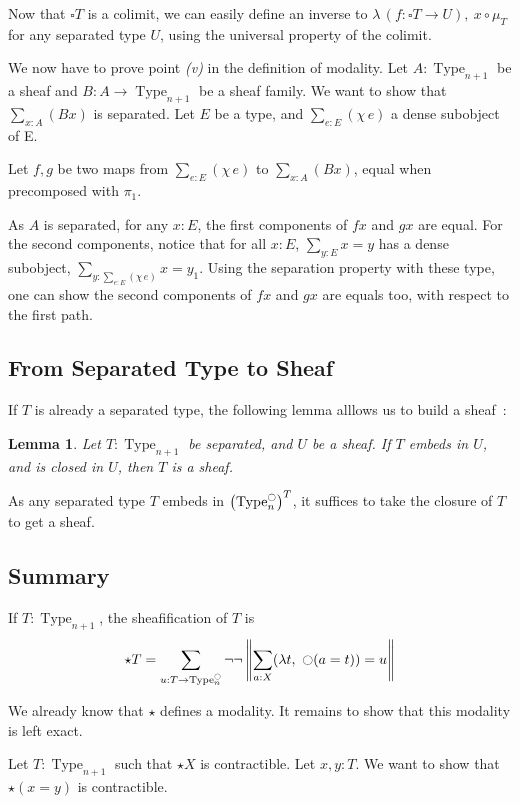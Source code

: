 \documentclass[conference]{IEEEtran}
\newtheorem{lem}[thm]{Lemma}
\DeclareMathOperator{\Type}{Type}
\newcommand{\modal}{\ensuremath{\ocircle}}
\begin{document}
Now that $\square T$ is a colimit, we can easily define an inverse to
$\lambda\,(f:\square T \to U),~x \circ \mu_T$ for any separated type
$U$, using the universal property of the colimit.

We now have to prove point {\it (v)} in the definition of
modality. Let $A:\Type_{n+1}$ be a sheaf and $B:A \to \Type_{n+1}$ be
a sheaf family. We want to show that $\sum_{x:A} (Bx)$ is
separated. Let $E$ be a type, and $\sum_{e:E} (\chi\,e)$ a dense
subobject of E.

Let $f,g$ be two maps from $\sum_{e:E} (\chi\,e)$ to $\sum_{x:A}
(Bx)$, equal when precomposed with $\pi_1$.

As $A$ is separated, for any $x:E$, the first components of $f x$ and
$g x$ are equal. For the second components, notice that for all $x:E$,
$\sum_{y:E} x = y$ has a dense subobject, $\sum_{y:\sum_{e:E} (\chi\,
  e)} x=y_1$. 
Using the separation property with these type, one can show the second
components of $f x$ and $g x$ are equals too, with respect to the
first path.


\subsection{From Separated Type to Sheaf}
\label{ssec:separated-to-sheaf}

If $T$ is already a separated type, the following lemma alllows us
to build a sheaf~:
\begin{lem}
  Let $T:\Type_{n+1}$ be separated, and $U$ be a sheaf. If $T$ embeds
  in $U$, and is closed in $U$, then $T$ is a sheaf.
\end{lem}

As any separated type $T$ embeds in $\left(\Type_n^\modal\right)^T$,
it suffices to take the closure of $T$ to get a sheaf.

\subsection{Summary}
\label{ssec:summary}

If $T:\Type_{n+1}$, the sheafification of $T$ is
$$\star T = \sum_{u:T \to \Type_n^\modal} \lnot\lnot\left\| \sum_{a:X} 
            (\lambda t,~\modal (a=t)) = u\right\|$$

We already know that $\star$ defines a modality. It remains to show
that this modality is left exact.

Let $T:\Type_{n+1}$ such that $\star X$ is contractible. Let
$x,y:T$. We want to show that $\star (x=y)$ is contractible.
\end{document}
